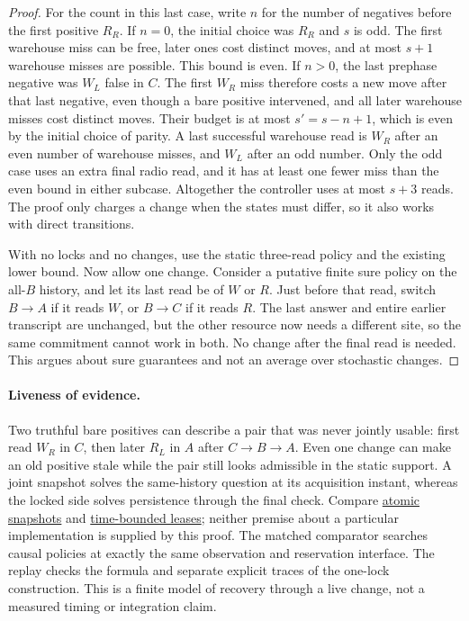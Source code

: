 \documentclass[11pt]{article}
\begin{document}
\begin{proof}
For the count in this last case, write $n$ for the number of negatives before the first positive $R_R$. If $n=0$, the initial choice was $R_R$ and $s$ is odd. The first warehouse miss can be free, later ones cost distinct moves, and at most $s+1$ warehouse misses are possible. This bound is even. If $n>0$, the last prephase negative was $W_L$ false in $C$. The first $W_R$ miss therefore costs a new move after that last negative, even though a bare positive intervened, and all later warehouse misses cost distinct moves. Their budget is at most $s'=s-n+1$, which is even by the initial choice of parity. A last successful warehouse read is $W_R$ after an even number of warehouse misses, and $W_L$ after an odd number. Only the odd case uses an extra final radio read, and it has at least one fewer miss than the even bound in either subcase. Altogether the controller uses at most $s+3$ reads. The proof only charges a change when the states must differ, so it also works with direct transitions.

With no locks and no changes, use the static three-read policy and the existing lower bound. Now allow one change. Consider a putative finite sure policy on the all-$B$ history, and let its last read be of $W$ or $R$. Just before that read, switch $B\to A$ if it reads $W$, or $B\to C$ if it reads $R$. The last answer and entire earlier transcript are unchanged, but the other resource now needs a different site, so the same commitment cannot work in both. No change after the final read is needed. This argues about sure guarantees and not an average over stochastic changes.
\end{proof}

\paragraph{Liveness of evidence.}
Two truthful bare positives can describe a pair that was never jointly usable: first read $W_R$ in $C$, then later $R_L$ in $A$ after $C\to B\to A$. Even one change can make an old positive stale while the pair still looks admissible in the static support. A joint snapshot solves the same-history question at its acquisition instant, whereas the locked side solves persistence through the final check. Compare \href{https://dspace.mit.edu/entities/publication/355717a8-388a-46a4-afc6-800d0d1522b8}{atomic snapshots} and \href{https://web.stanford.edu/class/cs240/WWW/readings/89-leases.pdf}{time-bounded leases}; neither premise about a particular implementation is supplied by this proof. The matched comparator searches causal policies at exactly the same observation and reservation interface. The replay checks the formula and separate explicit traces of the one-lock construction. This is a finite model of recovery through a live change, not a measured timing or integration claim.
\end{document}

